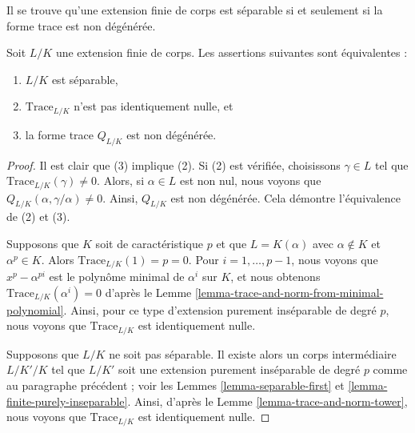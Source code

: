 \noindent
Il se trouve qu'une extension finie de corps est séparable si et seulement
si la forme trace est non dégénérée.

\begin{lemma}
\label{lemma-separable-trace-pairing}
Soit $L/K$ une extension finie de corps. Les assertions suivantes sont équivalentes :
\begin{enumerate}
\item $L/K$ est séparable,
\item $\text{Trace}_{L/K}$ n'est pas identiquement nulle, et
\item la forme trace $Q_{L/K}$ est non dégénérée.
\end{enumerate}
\end{lemma}

\begin{proof}
Il est clair que (3) implique (2). Si (2) est vérifiée, choisissons $\gamma \in L$
tel que $\text{Trace}_{L/K}(\gamma) \not = 0$. Alors, si $\alpha \in L$
est non nul, nous voyons que $Q_{L/K}(\alpha, \gamma/\alpha) \not = 0$.
Ainsi, $Q_{L/K}$ est non dégénérée. Cela démontre l'équivalence de
(2) et (3).

\medskip\noindent
Supposons que $K$ soit de caractéristique $p$ et que $L = K(\alpha)$ avec
$\alpha \not \in K$ et $\alpha^p \in K$. Alors $\text{Trace}_{L/K}(1) = p = 0$.
Pour $i = 1, \ldots, p - 1$, nous voyons que $x^p - \alpha^{pi}$ est le polynôme
minimal de $\alpha^i$ sur $K$, et nous obtenons
$\text{Trace}_{L/K}(\alpha^i) = 0$ d'après le
Lemme \ref{lemma-trace-and-norm-from-minimal-polynomial}.
Ainsi, pour ce type d'extension purement inséparable de degré $p$,
nous voyons que $\text{Trace}_{L/K}$ est identiquement nulle.

\medskip\noindent
Supposons que $L/K$ ne soit pas séparable. Il existe alors un corps intermédiaire
$L/K'/K$ tel que $L/K'$ soit une extension purement inséparable de degré $p$
comme au paragraphe précédent ; voir les
Lemmes \ref{lemma-separable-first} et \ref{lemma-finite-purely-inseparable}.
Ainsi, d'après le Lemme \ref{lemma-trace-and-norm-tower},
nous voyons que $\text{Trace}_{L/K}$ est identiquement nulle.


\end{proof}
